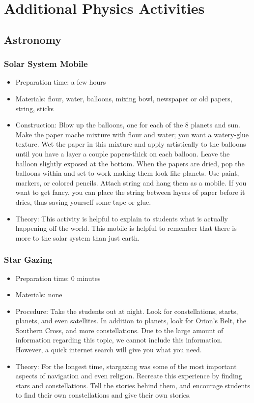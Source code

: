 \chapter{Additional Physics Activities}

\section{Astronomy}

\subsection{Solar System Mobile}
\begin{itemize}
\item{Preparation time: a few hours}
\item{Materials: flour, water, balloons, mixing bowl, newspaper or old papers, string, sticks}
\item{Construction: Blow up the balloons, one for each of the 8 planets and sun. Make the paper mache mixture with flour and water; you want a watery-glue texture. Wet the paper in this mixture and apply artistically to the balloons until you have a layer a couple papers-thick on each balloon. Leave the balloon slightly exposed at the bottom. When the papers are dried, pop the balloons within and set to work making them look like planets. Use paint, markers, or colored pencils. Attach string and hang them as a mobile. If you want to get fancy, you can place the string between layers of paper before it dries, thus saving yourself some tape or glue.}
\item{Theory: This activity is helpful to explain to students what is actually happening off the world. This mobile is helpful to remember that there is more to the solar system than just earth.}
\end{itemize}

\subsection{Star Gazing}
\begin{itemize}
\item{Preparation time: 0 minutes}
\item{Materials: none}
\item{Procedure: Take the students out at night. Look for constellations, starts, planets, and even satellites. In addition to planets, look for Orion’s Belt, the Southern Cross, and more constellations. Due to the large amount of information regarding this topic, we cannot include this information. However, a quick internet search will give you what you need.}
\item{Theory: For the longest time, stargazing was some of the most important aspects of navigation and even religion. Recreate this experience by finding stars and constellations. Tell the stories behind them, and encourage students to find their own constellations and give their own stories.}
\end{itemize}

